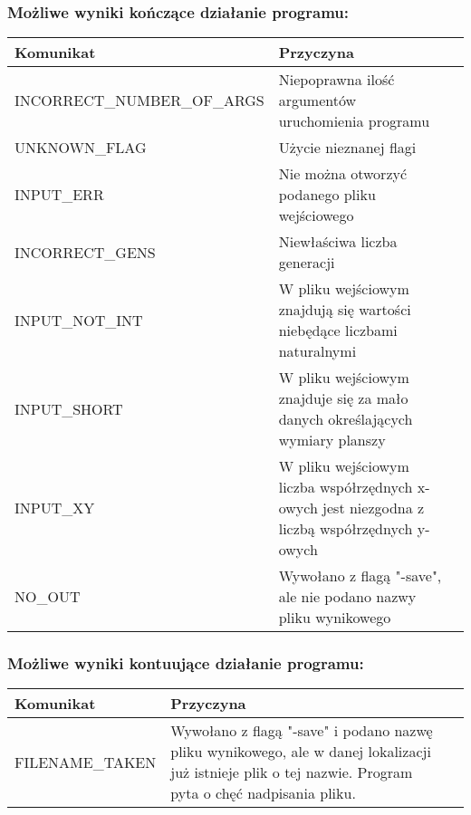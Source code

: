 \documentclass[11pt,a4paper]{report}
\begin{document}
\subsubsection {Możliwe wyniki kończące działanie programu:}
\begin{tabularx}{\textwidth}{  X|Xl  }
 \hline
 Komunikat                                   					& Przyczyna\\
 \hline \hline
			INCORRECT\_NUMBER\_OF\_ARGS	&Niepoprawna ilość argumentów uruchomienia programu\\
 \hline
			UNKNOWN\_FLAG	 			&Użycie nieznanej flagi\\
 \hline
			INPUT\_ERR					&Nie można otworzyć podanego pliku wejściowego\\
 \hline
			INCORRECT\_GENS				&Niewłaściwa liczba generacji\\
 \hline
			INPUT\_NOT\_INT				&W pliku wejściowym znajdują się wartości niebędące liczbami naturalnymi\\
 \hline
			INPUT\_SHORT				&W pliku wejściowym znajduje się za mało danych określających wymiary planszy\\
 \hline
			INPUT\_XY					&W pliku wejściowym liczba współrzędnych x-owych jest niezgodna z liczbą współrzędnych y-owych\\
 \hline
			NO\_OUT					&Wywołano z flagą "-save", ale nie podano nazwy pliku wynikowego\\
 \hline
\end{tabularx}

\subsubsection{Możliwe wyniki kontuujące działanie programu:}
\begin{tabularx}{\textwidth}{  X|Xl  }
\hline
Komunikat                                    					& Przyczyna\\
\hline \hline

			FILENAME\_TAKEN				&Wywołano z flagą "-save" i podano nazwę pliku wynikowego, ale w danej lokalizacji już istnieje plik o tej nazwie. Program pyta o chęć nadpisania pliku.\\
\hline
\end{tabularx}
\end{document}
